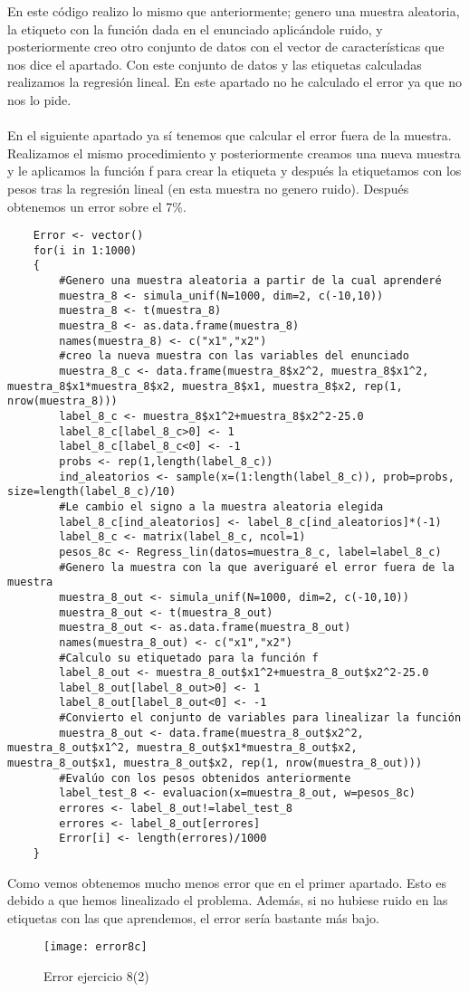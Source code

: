 	En este código realizo lo mismo que anteriormente; genero una muestra aleatoria, la etiqueto con la función dada en el enunciado aplicándole ruido, y posteriormente creo otro conjunto de datos con el vector de características que nos dice el apartado. Con este conjunto de datos y las etiquetas calculadas realizamos la regresión lineal. En este apartado no he calculado el error ya que no nos lo pide.
	\\
	\\
	En el siguiente apartado ya sí tenemos que calcular el error fuera de la muestra. Realizamos el mismo procedimiento y posteriormente creamos una nueva muestra y le aplicamos la función f para crear la etiqueta y después la etiquetamos con los pesos tras la regresión lineal (en esta muestra no genero ruido). Después obtenemos un error sobre el 7\%.
	\begin{lstlisting}
	Error <- vector()
	for(i in 1:1000)
	{
		#Genero una muestra aleatoria a partir de la cual aprenderé
		muestra_8 <- simula_unif(N=1000, dim=2, c(-10,10))
		muestra_8 <- t(muestra_8)
		muestra_8 <- as.data.frame(muestra_8)
		names(muestra_8) <- c("x1","x2")
		#creo la nueva muestra con las variables del enunciado
		muestra_8_c <- data.frame(muestra_8$x2^2, muestra_8$x1^2, muestra_8$x1*muestra_8$x2, muestra_8$x1, muestra_8$x2, rep(1, nrow(muestra_8)))
		label_8_c <- muestra_8$x1^2+muestra_8$x2^2-25.0
		label_8_c[label_8_c>0] <- 1
		label_8_c[label_8_c<0] <- -1
		probs <- rep(1,length(label_8_c))
		ind_aleatorios <- sample(x=(1:length(label_8_c)), prob=probs, size=length(label_8_c)/10)
		#Le cambio el signo a la muestra aleatoria elegida
		label_8_c[ind_aleatorios] <- label_8_c[ind_aleatorios]*(-1)
		label_8_c <- matrix(label_8_c, ncol=1)
		pesos_8c <- Regress_lin(datos=muestra_8_c, label=label_8_c)
		#Genero la muestra con la que averiguaré el error fuera de la muestra
		muestra_8_out <- simula_unif(N=1000, dim=2, c(-10,10))
		muestra_8_out <- t(muestra_8_out)
		muestra_8_out <- as.data.frame(muestra_8_out)
		names(muestra_8_out) <- c("x1","x2")
		#Calculo su etiquetado para la función f
		label_8_out <- muestra_8_out$x1^2+muestra_8_out$x2^2-25.0
		label_8_out[label_8_out>0] <- 1
		label_8_out[label_8_out<0] <- -1
		#Convierto el conjunto de variables para linealizar la función
		muestra_8_out <- data.frame(muestra_8_out$x2^2, muestra_8_out$x1^2, muestra_8_out$x1*muestra_8_out$x2, muestra_8_out$x1, muestra_8_out$x2, rep(1, nrow(muestra_8_out)))
		#Evalúo con los pesos obtenidos anteriormente
		label_test_8 <- evaluacion(x=muestra_8_out, w=pesos_8c)
		errores <- label_8_out!=label_test_8
		errores <- label_8_out[errores]
		Error[i] <- length(errores)/1000
	}
	\end{lstlisting}
	Como vemos obtenemos mucho menos error que en el primer apartado. Esto es debido a que hemos linealizado el problema. Además, si no hubiese ruido en las etiquetas con las que aprendemos, el error sería bastante más bajo.
	\begin{figure} [H]
	\centering
	\texttt{[image: error8c]}
	\caption{Error ejercicio 8(2)}
	\label{fig:error8c}
	\end{figure}
	
